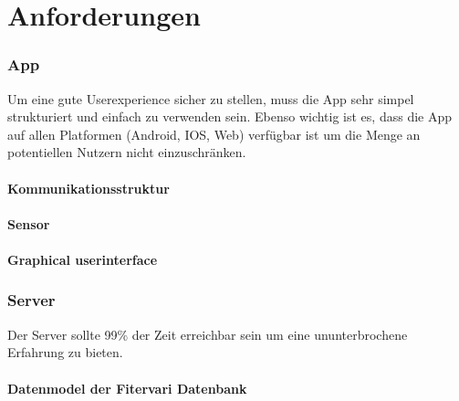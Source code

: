 \documentclass[12pt]{article}
\theoremstyle{definition}
\begin{document}
\pagebreak

\section{Anforderungen}

\subsubsection{App}
Um eine gute Userexperience sicher zu stellen, muss die App sehr simpel strukturiert und einfach zu verwenden sein. Ebenso wichtig ist es, dass die App auf allen Platformen (Android, IOS, Web) verfügbar ist um die Menge an potentiellen Nutzern nicht einzuschränken.

\paragraph{Kommunikationsstruktur}
\begin{center}

\end{center}
\pagebreak
\paragraph{Sensor}
\begin{center}

\end{center}

\paragraph{Graphical userinterface}
\begin{flushleft}

\end{flushleft}

\begin{flushleft}

\end{flushleft}

\subsubsection{Server}
Der Server sollte 99\% der Zeit erreichbar sein um eine ununterbrochene Erfahrung zu bieten.\\
\paragraph{Datenmodel der Fitervari Datenbank}
\begin{center}

\end{center}
\pagebreak
\end{document}
